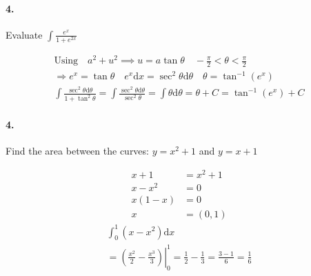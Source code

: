     \paragraph*{4.}
    Evaluate $\int\frac{e^x}{1+e^{2x}}$

    \begin{mdframed}
        \begin{equation*}
            \begin{gathered}
                \text{Using} \quad a^2 + u^2 \implies u = a\tan\theta \quad -\frac{\pi}{2} < \theta < \frac{\pi}{2}  \\
                \Rightarrow e^x = \tan\theta \quad e^x\mathrm{d}x = \sec^{2}\theta\mathrm{d}\theta \quad \theta = \tan^{-1}\left(e^x\right) \\
                \int\frac{\sec^2\theta\mathrm{d}\theta}{1+\tan^2\theta} = \int\frac{\sec^2\theta\mathrm{d}\theta}{\sec^2\theta} = \int\theta\mathrm{d}\theta = \theta + C = \boxed{\tan^{-1}\left(e^x\right) + C}
            \end{gathered}
        \end{equation*}
    \end{mdframed}

    \paragraph*{4.}
    Find the area between the curves: $y = x^2 + 1$ and $y = x + 1$

    \begin{mdframed}
        \begin{multicols*}{2}
            \begin{align*}
                x + 1   & = x^2 + 1   \\
                x - x^2 & = 0       \\
                x(1 - x)& = 0       \\
                      x & = (0, 1)
            \end{align*}
            \begin{equation*}
                \begin{gathered}
                    \int_{0}^{1}(x- x^2)\mathrm{d}x    \\
                    = \left.\left(\frac{x^2}{2}-\frac{x^3}{3}\right)\right|_{0}^{1} = \frac{1}{2}-\frac{1}{3} = \frac{3-1}{6} = \boxed{\frac{1}{6}}
                \end{gathered}
            \end{equation*}
        \end{multicols*}
    \end{mdframed}

